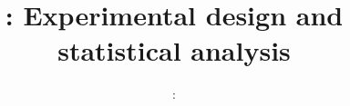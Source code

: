 \usepackage{../../beamerthemeFalmouthGamesAcademy}
\usepackage{multimedia}
\graphicspath{ {../../} }


\usepackage[normalem]{ulem}
\usepackage{wasysym}

\usepackage{algpseudocode}

\usepackage{pdfpages}

\usepackage{fancyvrb}

\usetikzlibrary{arrows,automata}



\newcommand{\bitems}{\begin{itemize}\item}
\newcommand{\eitem}{\end{itemize}}
\newcommand{\spitem}{\item}
\newcommand{\vone}{\par\vspace{2ex}\par}
\newcommand{\vhalf}{\par}


\title{\sessionnumber: Experimental design and statistical analysis}
\subtitle{\modulecode: \moduletitle}

\frame{\titlepage} 







